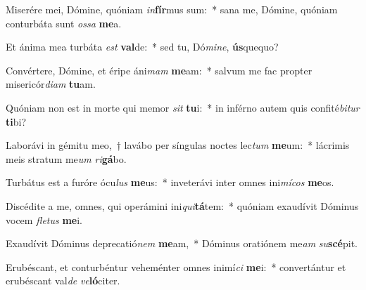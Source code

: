 \item Miserére mei, Dómine, quóniam \textit{in}\textbf{fír}mus sum:~* sana me, Dómine, quóniam conturbáta sunt \textit{os}\textit{sa} \textbf{me}a.
\item Et ánima mea turbáta \textit{est} \textbf{val}de:~* sed tu, Dó\textit{mi}\textit{ne}, \textbf{ús}quequo?
\item Convértere, Dómine, et éripe áni\textit{mam} \textbf{me}am:~* salvum me fac propter misericór\textit{di}\textit{am} \textbf{tu}am.
\item Quóniam non est in morte qui memor \textit{sit} \textbf{tu}i:~* in inférno autem quis confité\textit{bi}\textit{tur} \textbf{ti}bi?
\item Laborávi in gémitu meo,~† lavábo per síngulas noctes lec\textit{tum} \textbf{me}um:~* lácrimis meis stratum me\textit{um} \textit{ri}\textbf{gá}bo.
\item Turbátus est a furóre ócu\textit{lus} \textbf{me}us:~* inveterávi inter omnes ini\textit{mí}\textit{cos} \textbf{me}os.
\item Discédite a me, omnes, qui operámini ini\textit{qui}\textbf{tá}tem:~* quóniam exaudívit Dóminus vocem \textit{fle}\textit{tus} \textbf{me}i.
\item Exaudívit Dóminus deprecatió\textit{nem} \textbf{me}am,~* Dóminus oratiónem me\textit{am} \textit{su}\textbf{scé}pit.
\item Erubéscant, et conturbéntur veheménter omnes inimí\textit{ci} \textbf{me}i:~* convertántur et erubéscant val\textit{de} \textit{ve}\textbf{ló}citer.

